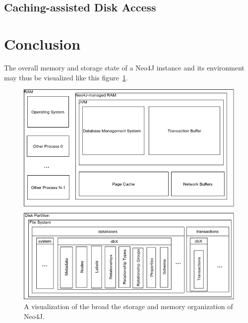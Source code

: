 \documentclass[a4paper,10pt]{article}
\begin{document}
\subsection{Caching-assisted Disk Access}


\section{Conclusion}
The overall memory and storage state of a Neo4J instance and its environment may thus be visualized like this figure~\ref{N4J_memory_view}.

\begin{figure}[htp]\label{N4J_memory_view}
 \begin{center}
  \includegraphics[keepaspectratio,width=\textwidth]{img/N4J_memory_view.png}
 \end{center}
 \caption{A visualization of the broad the storage and memory organization of Neo4J.} %
\end{figure}
\end{document}
